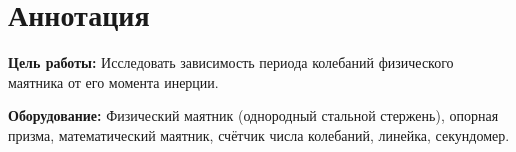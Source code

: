 \section{Аннотация}
\textbf{Цель работы:} Исследовать зависимость периода колебаний физического
маятника от его момента инерции.

\textbf{Оборудование:} Физический маятник (однородный стальной стержень),
опорная призма, математический маятник, счётчик числа колебаний, линейка,
секундомер.
